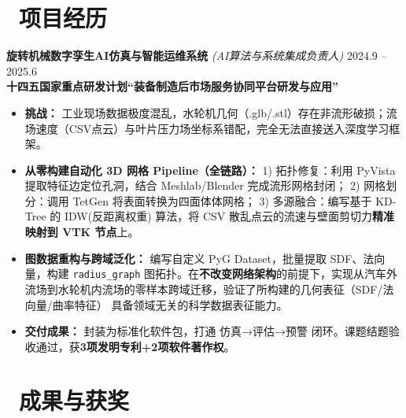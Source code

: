 \documentclass[11pt]{article}
\begin{document}
\section{\makebox[\widthof{\faBriefcase}][c]{\color{CVBlue}%
\faBriefcase}\ 项目经历}

\textbf{旋转机械数字孪生AI仿真与智能运维系统} 
\textit{(AI算法与系统集成负责人)} 
\hfill 2024.9 -- 2025.6\\[0.2em]
\textcolor{CVBlue}{\textbf{十四五国家重点研发计划``装备制造后市场服务协同平台研发与应用''}}
\begin{itemize}
    \item \textbf{挑战：} 工业现场数据极度混乱，水轮机几何（.glb/.stl）存在非流形破损；流场速度（CSV点云）与叶片压力场坐标系错配，完全无法直接送入深度学习框架。
    \item \textbf{从零构建自动化 3D 网格 Pipeline（全链路）：} 
        1) 拓扑修复：利用 PyVista 提取特征边定位孔洞，结合 Meshlab/Blender 完成流形网格封闭；
        2) 网格划分：调用 TetGen 将表面转换为四面体体网格；
        3) 多源融合：编写基于 KD-Tree 的 IDW(反距离权重) 算法，将 CSV 散乱点云的流速与壁面剪切力\textbf{精准映射到 VTK 节点}上。
    \item \textbf{图数据重构与跨域泛化：} 编写自定义 PyG Dataset，批量提取 SDF、法向量，构建 \texttt{radius\_graph} 图拓扑。在\textbf{不改变网络架构}的前提下，实现从汽车外流场到水轮机内流场的零样本跨域迁移，验证了所构建的几何表征（SDF/法向量/曲率特征） 具备领域无关的科学数据表征能力。
    \item \textbf{交付成果：} 封装为标准化软件包，打通 仿真→评估→预警 闭环。课题结题验收通过，获\textbf{3项发明专利+2项软件著作权}。
\end{itemize}



\section{%
    \makebox[\widthof{\faTrophy}][c]%
    {\color{CVBlue}\faTrophy}\ 成果与获奖%
}
\end{document}
